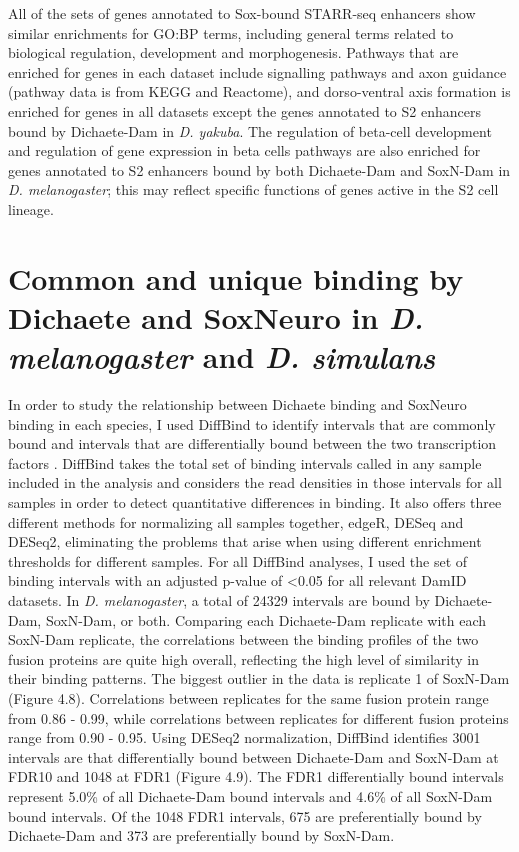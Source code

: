 All of the sets of genes annotated to Sox-bound STARR-seq enhancers show similar enrichments for GO:BP terms, including general terms related to biological regulation, development and morphogenesis. Pathways that are enriched for genes in each dataset include signalling pathways and axon guidance (pathway data is from KEGG and Reactome), and dorso-ventral axis formation is enriched for genes in all datasets except the genes annotated to S2 enhancers bound by Dichaete-Dam in \emph{D. yakuba}. The regulation of beta-cell development and regulation of gene expression in beta cells pathways are also enriched for genes annotated to S2 enhancers bound by both Dichaete-Dam and SoxN-Dam in \emph{D. melanogaster}; this may reflect specific functions of genes active in the S2 cell lineage.

\section{Common and unique binding by Dichaete and SoxNeuro in \emph{D. melanogaster} and \emph{D. simulans}}
In order to study the relationship between Dichaete binding and SoxNeuro binding in each species, I used DiffBind to identify intervals that are commonly bound and intervals that are differentially bound between the two transcription factors \citep{ross-innes_differential_2012-1}. DiffBind takes the total set of binding intervals called in any sample included in the analysis and considers the read densities in those intervals for all samples in order to detect quantitative differences in binding. It also offers three different methods for normalizing all samples together, edgeR, DESeq and DESeq2, eliminating the problems that arise when using different enrichment thresholds for different samples. For all DiffBind analyses, I used the set of binding intervals with an adjusted p-value of \textless 0.05 for all relevant DamID datasets. In \emph{D. melanogaster}, a total of 24329 intervals are bound by Dichaete-Dam, SoxN-Dam, or both. Comparing each Dichaete-Dam replicate with each SoxN-Dam replicate, the correlations between the binding profiles of the two fusion proteins are quite high overall, reflecting the high level of similarity in their binding patterns. The biggest outlier in the data is replicate 1 of SoxN-Dam (Figure 4.8). Correlations between replicates for the same fusion protein range from 0.86 - 0.99, while correlations between replicates for different fusion proteins range from 0.90 - 0.95. Using DESeq2 normalization, DiffBind identifies 3001 intervals are that differentially bound between Dichaete-Dam and SoxN-Dam at FDR10 and 1048 at FDR1 (Figure 4.9). The FDR1 differentially bound intervals represent 5.0\% of all Dichaete-Dam bound intervals and 4.6\% of all SoxN-Dam bound intervals. Of the 1048 FDR1 intervals, 675 are preferentially bound by Dichaete-Dam and 373 are preferentially bound by SoxN-Dam.\\

